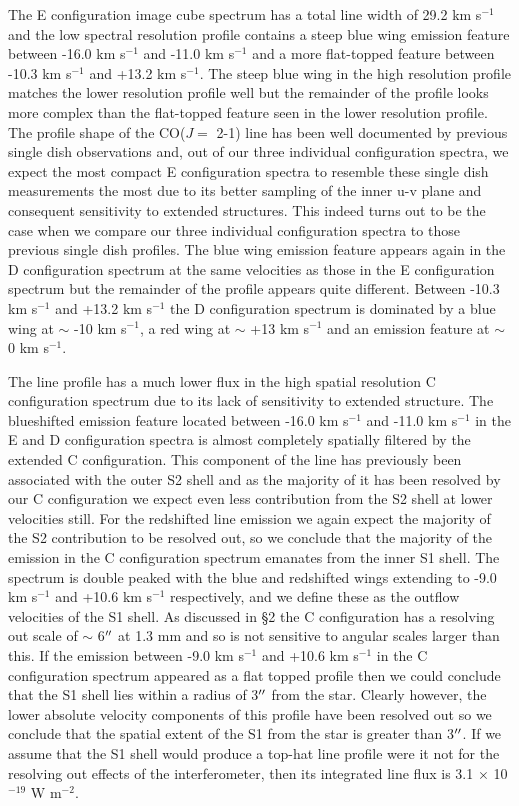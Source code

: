 \documentclass[iop]{emulateapj}
\begin{document}
The E configuration image cube spectrum has a total line width of 29.2 km s${}^{-1}$ and the low spectral resolution profile contains a steep blue wing emission feature between -16.0 km s${}^{-1}$ and -11.0 km s${}^{-1}$ and a more flat-topped feature between -10.3 km s${}^{-1}$ and +13.2 km s${}^{-1}$. The steep blue wing in the high resolution profile matches the lower resolution profile well but the  remainder of the profile looks more complex than the flat-topped feature seen in the lower resolution profile. The profile shape of the CO($J=$ 2-1) line has been well documented by previous single dish observations \citep[e.g.][]{1980ApJ...242L..25K, 1987ApJ...313..400H} and, out of our three individual configuration spectra, we expect the most compact E configuration spectra to resemble these single dish measurements the most due to its better sampling of the inner u-v plane and consequent sensitivity to extended structures. This indeed turns out to be the case when we compare our three individual configuration spectra to those previous single dish profiles. The blue wing emission feature appears again in the D configuration spectrum at the same velocities as those in the E configuration spectrum but the remainder of the profile appears quite different. Between -10.3 km s${}^{-1}$ and +13.2 km s${}^{-1}$ the D configuration spectrum is dominated by a blue wing at $\sim$ -10 km s${}^{-1}$, a red wing at $\sim$ +13 km s${}^{-1}$ and an emission feature at $\sim$ 0 km s${}^{-1}$. 

The line profile has a much lower flux in the high spatial resolution C configuration spectrum due to its lack of sensitivity to extended structure. The blueshifted emission feature located between -16.0 km s${}^{-1}$ and -11.0 km s${}^{-1}$ in the E and D configuration spectra is almost completely spatially filtered by the extended C configuration. This component of the line has previously been associated with the outer S2 shell \citep{1987ApJ...313..400H} and as the majority of it has been resolved by our C configuration we expect even less contribution from the S2 shell at lower velocities still. For the redshifted line emission we again expect the majority of the S2 contribution to be resolved out, so we conclude that the majority of the emission in the C configuration spectrum emanates from the inner S1 shell. The spectrum is double peaked with the blue and redshifted wings extending to -9.0 km s${}^{-1}$ and +10.6 km s${}^{-1}$ respectively, and we define these as the outflow velocities of the S1 shell. As discussed in \S2 the C configuration has a resolving out scale of $\sim$ 6$\mbox{$^{\prime\prime}$}$ at 1.3 mm and so is not sensitive to angular scales larger than this. If the emission between -9.0 km s${}^{-1}$ and +10.6 km s${}^{-1}$ in the C configuration spectrum appeared as a flat topped profile then we could conclude that the S1 shell lies within a radius of 3$\mbox{$^{\prime\prime}$}$ from the star. Clearly however, the lower absolute velocity components of this profile have been resolved out so we conclude that the spatial extent of the S1 from the star is greater than 3$\mbox{$^{\prime\prime}$}$. If we assume that the S1 shell would produce a top-hat line profile were it not for the resolving out effects of the interferometer, then its integrated line flux is 3.1 $\times$ 10${}^{-19}$ W m${}^{-2}$.
\end{document}

